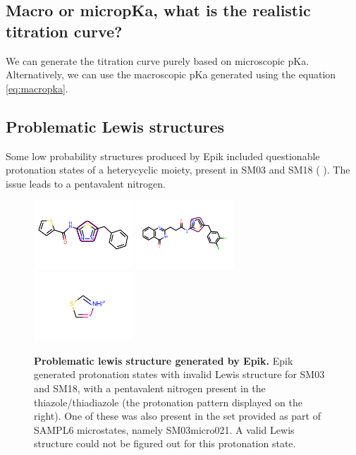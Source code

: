 \documentclass[9pt,lineno,final]{elife}
\begin{document}
\subsection{Macro or micropKa, what is the realistic titration curve?}
We can generate the titration curve purely based on microscopic pKa. Alternatively,
we can use the macroscopic pKa generated using the equation \cref{eq:macropka}.

\subsection{Problematic Lewis structures}

Some low probability structures produced by Epik included questionable protonation states of a heterycyclic moiety, present in SM03 and SM18 ( ).  The issue leads to a pentavalent nitrogen.



\begin{figure}[H]	
\centering
\includegraphics[width=0.33\textwidth]{Images/Molecules/SM03-smarts.pdf}
\includegraphics[width=0.33\textwidth]{Images/Molecules/SM18-smarts.pdf}
\includegraphics[width=0.33\textwidth]{Images/Molecules/lewis-problem.pdf}
\caption{{\bf Problematic lewis structure generated by Epik.}
Epik generated protonation states with invalid Lewis structure for SM03 and SM18, with a pentavalent nitrogen present in the thiazole/thiadiazole (the protonation pattern displayed on the right). One of these was also present in the set provided as part of SAMPL6  microstates, namely SM03\textunderscore{}micro021. A valid Lewis structure could not be figured out for this protonation state.}
\label{fig:lewis-structure-SM03-SM18}
\end{figure}		
\end{document}
